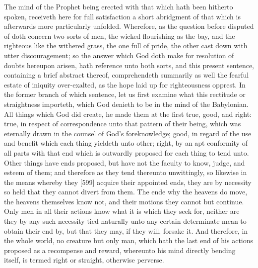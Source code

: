 The mind of the Prophet being erected with that which hath been hitherto spoken, receiveth here for full satisfaction a short abridgment of that which is afterwards more particularly unfolded. Wherefore, as the question before disputed of doth concern two sorts of men, the wicked flourishing as the bay, and the righteous like the withered grass, the one full of pride, the other cast down with utter discouragement; so the answer which God doth make for resolution of doubts hereupon arisen, hath reference unto both sorts, and this present sentence, containing a brief abstract thereof, comprehendeth summarily as well the fearful estate of iniquity over-exalted, as the hope laid up for righteousness opprest. In the former branch of which sentence, let us first examine what this rectitude or straightness importeth, which God denieth to be in the mind of the Babylonian. All things which God did create, he made them at the first true, good, and right: true, in respect of correspondence unto that pattern of their being, which was eternally drawn in the counsel of God’s foreknowledge; good, in regard of the use and benefit which each thing yieldeth unto other; right, by an apt conformity of all parts with that end which is outwardly proposed for each thing to tend unto. Other things have ends proposed, but have not the faculty to know, judge, and esteem of them; and therefore as they tend thereunto unwittingly, so likewise in the means whereby they [599] acquire their appointed ends, they are by necessity so held that they cannot divert from them. The ende why the heavens do move, the heavens themselves know not, and their motions they cannot but continue. Only men in all their actions know what it is which they seek for, neither are they by any such necessity tied naturally unto any certain determinate mean to obtain their end by, but that they may, if they will, forsake it. And therefore, in the whole world, no creature but only man, which hath the last end of his actions proposed as a recompense and reward, whereunto his mind directly bending itself, is termed right or straight, otherwise perverse.

